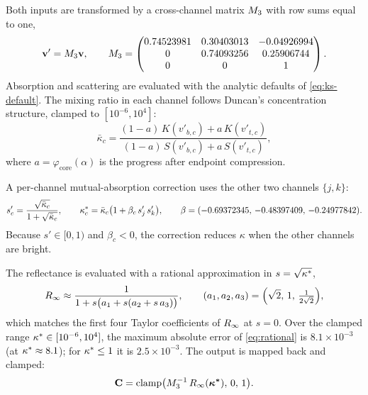 Both inputs are transformed by a cross-channel matrix $M_{3}$ with row sums equal to one,
\begin{equation}
\mathbf{v}'=M_{3}\mathbf{v},\qquad
M_{3}=
\begin{pmatrix}
0.74523981 & 0.30403013 & -0.04926994\\
0 & 0.74093256 & 0.25906744\\
0 & 0 & 1
\end{pmatrix}.
\label{eq:m3}
\end{equation}
Absorption and scattering are evaluated with the analytic defaults of \cref{eq:ks-default}. The mixing ratio in each channel follows Duncan's concentration structure, clamped to $[10^{-6},10^{4}]$:
\begin{equation}
\bar{\kappa}_{c}=
\frac{(1-a)\,K(v'_{b,c})+a\,K(v'_{t,c})}
     {(1-a)\,S(v'_{b,c})+a\,S(v'_{t,c})},
\label{eq:kappa}
\end{equation}
where $a=\varphi_{\mathrm{core}}(\alpha)$ is the progress after endpoint compression.

A per-channel mutual-absorption correction uses the other two channels $\{j,k\}$:
\begin{equation}
s'_{c}=\frac{\sqrt{\bar{\kappa}_{c}}}{1+\sqrt{\bar{\kappa}_{c}}},\qquad
\kappa^{\ast}_{c}=\bar{\kappa}_{c}\bigl(1+\beta_{c}\,s'_{j}\,s'_{k}\bigr),\qquad
\beta=(-0.69372345,\,-0.48397409,\,-0.24977842).
\label{eq:beta}
\end{equation}
Because $s'\in[0,1)$ and $\beta_{c}<0$, the correction reduces $\kappa$ when the other channels are bright.

The reflectance is evaluated with a rational approximation in $s=\sqrt{\kappa^{\ast}}$,
\begin{equation}
R_{\infty}\approx\frac{1}{1+s\bigl(a_{1}+s(a_{2}+s\,a_{3})\bigr)},\qquad
(a_{1},a_{2},a_{3})=\Bigl(\sqrt{2},\,1,\,\tfrac{1}{2\sqrt{2}}\Bigr),
\label{eq:rational}
\end{equation}
which matches the first four Taylor coefficients of $R_{\infty}$ at $s=0$. Over the clamped range $\kappa^{\ast}\in[10^{-6},10^{4}]$, the maximum absolute error of \cref{eq:rational} is $8.1\times10^{-3}$ (at $\kappa^{\ast}\approx8.1$); for $\kappa^{\ast}\le1$ it is $2.5\times10^{-3}$. The output is mapped back and clamped:
\begin{equation}
\mathbf{C}=\operatorname{clamp}\bigl(M_{3}^{-1}\,R_{\infty}(\boldsymbol{\kappa^{\ast}}),\,0,\,1\bigr).
\label{eq:core-output}
\end{equation}

